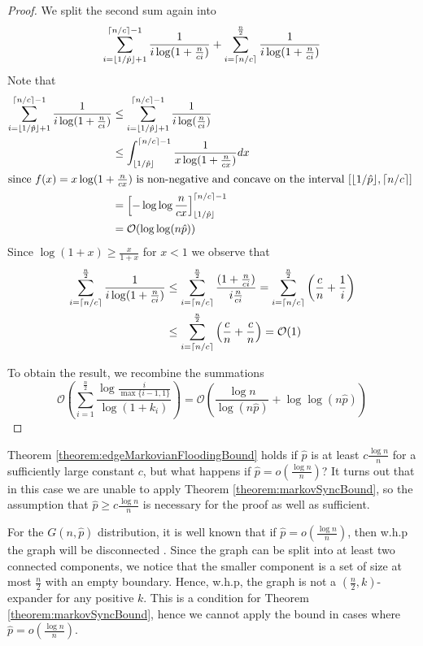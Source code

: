 \begin{proof}
	We split the second sum again into
	$$	
		\sum_{i=\lfloor1/\hat{p}\rfloor + 1}^{\lceil n/c\rceil-1} \frac{1}{i\log(1+\frac{n}{ci})} 
		+ 
		\sum_{i=\lceil n/c\rceil}^\frac{n}{2} \frac{1}{i\log(1+\frac{n}{ci})} 
	$$
	Note that
	\begin{align*}
		\sum_{i=\lfloor1/\hat{p}\rfloor + 1}^{\lceil n/c\rceil-1} \frac{1}{i\log(1+\frac{n}{ci})} 
		& \leq \sum_{i=\lfloor1/\hat{p}\rfloor + 1}^{\lceil n/c\rceil-1} \frac{1}{i\log(\frac{n}{ci})} \\
		& \leq \int_{\lfloor1/\hat{p}\rfloor}^{\lceil n/c\rceil-1} \frac{1}{x\log(1+\frac{n}{cx})} dx \\
		\intertext{since $f(x) = x\log(1+\frac{n}{cx})$ is non-negative and concave on the interval $[\lfloor1/\hat{p}\rfloor, \lceil n/c\rceil]$ }
		& = \left[-\log\log \frac{n}{cx}\right]_{\lfloor1/\hat{p}\rfloor}^{\lceil n/c\rceil-1} \\
		&= \mathcal{O}(\log \log (n \hat{p}))
	\end{align*}
	Since $\log(1+x) \geq \frac{x}{1+x}$ for $x < 1$ we observe that
	\begin{align*}
		\sum_{i=\lceil n/c\rceil}^\frac{n}{2} \frac{1}{i\log(1+\frac{n}{ci})} 
		& \leq 
		\sum_{i=\lceil n/c\rceil}^\frac{n}{2} \frac{(1 + \frac{n}{ci})}{i\frac{n}{ci}} 
		= 
		\sum_{i=\lceil n/c\rceil}^\frac{n}{2} \left( \frac{c}{n} + \frac{1}{i} \right) \\
		& \leq 
		\sum_{i=\lceil n/c\rceil}^\frac{n}{2} \left( \frac{c}{n} + \frac{c}{n} \right)
		= \mathcal{O}(1)
	\end{align*}

	To obtain the result, we recombine the summations
	$$
		\mathcal{O}\left(\sum_{i=1}^\frac{n}{2} \frac{\log \frac{i}{\max\{i-1,1\}}}{\log(1+k_i)}\right) =
		\mathcal{O}\left(\frac{\log n}{\log (n\hat{p})} + \log \log (n\hat{p})\right)
	$$

\end{proof}

Theorem \ref{theorem:edgeMarkovianFloodingBound} holds if $\hat{p}$ is at least $c \frac{\log n}{n}$ for a sufficiently large constant $c$, but what happens if $\hat{p} = o(\frac{\log n}{n})$? 
It turns out that in this case we are unable to apply Theorem \ref{theorem:markovSyncBound}, so the assumption that $\hat{p} \geq c \frac{\log n}{n}$ is necessary for the proof as well as sufficient.

For the $G(n, \hat{p})$ distribution, it is well known that if $\hat{p} = o(\frac{\log n}{n})$, then w.h.p the graph will be disconnected \cite{complexNetworksRandomGraphs}. Since the graph can be split into at least two connected components, we notice that the smaller component is a set of size at most $\frac{n}{2}$ with an empty boundary. Hence, w.h.p, the graph is not a $(\frac{n}{2}, k)$-expander for any positive $k$. This is a condition for Theorem \ref{theorem:markovSyncBound}, hence we cannot apply the bound in cases where $\hat{p} = o(\frac{\log n}{n})$.

